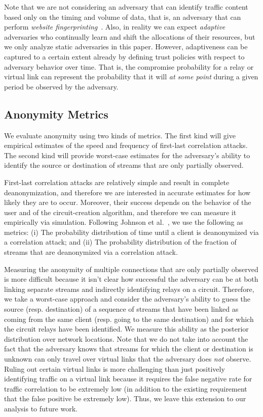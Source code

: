 \documentclass[conference]{styles/IEEEtran}
\begin{document}
Note that we are not considering an adversary that can identify traffic content based only on
the timing and volume of data, that is, an adversary that can perform
\emph{website fingerprinting}~\cite{fingerprinting-wang-wpes13}. Also,
in reality we can expect \emph{adaptive} adversaries who continually learn and shift the
allocations of their resources, but we only analyze static adversaries in this paper. However,
adaptiveness can be captured to a certain extent already by defining trust policies with respect
to adversary behavior over time. That is, the compromise probability for a relay or virtual link
can represent the probability that it will \emph{at some point} during a given period be observed
by the adversary.

\subsection{Anonymity Metrics}
We evaluate anonymity using two kinds of metrics. The first kind will give empirical estimates of
the speed and frequency of first-last correlation attacks. The second kind will
provide worst-case estimates for the adversary's ability to identify the source or destination of
streams that are only partially observed.

First-last correlation attacks are relatively simple and result in complete deanonymization, and
therefore we are interested in accurate estimates for how likely they are to occur. Moreover,
their success depends on the behavior of the user and of the circuit-creation algorithm, and
therefore we can measure it empirically via simulation. Following Johnson et
al.~\cite{ccs2013-usersrouted}, we use the following as metrics: (i) The probability distribution of time until a client is deanonymized via a correlation attack; and (ii) The probability distribution of the fraction of streams that are deanonymized via a correlation attack.

Measuring the anonymity of multiple connections that are only partially observed is more difficult
because it isn't clear how successful the adversary can be at both linking separate streams and
indirectly identifying relays on a circuit. Therefore, we take a worst-case approach and consider
the adversary's ability to guess the source (resp. destination) of a sequence of streams that
have been linked as coming from the same client (resp. going to the same destination) and for
which the circuit relays have been identified. We measure this ability as the posterior
distribution over network locations. Note that we do not take into account the fact that the
adversary knows that streams for which the client or destination is unknown can only travel over
virtual links that the adversary does \emph{not} observe. Ruling out certain virtual links is more
challenging than just positively identifying traffic on a virtual link because it requires the
false negative rate for traffic correlation to be extremely low (in addition to the existing
requirement that the false positive be extremely low). Thus, we leave this extension to
our analysis to future work.
\end{document}

